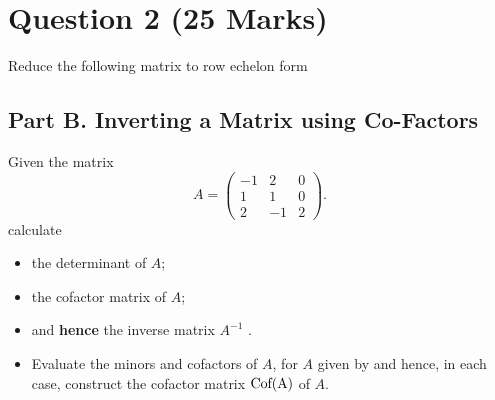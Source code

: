 \documentclass[12pt,a4paper]{article}
\begin{document}
	\section*{Question 2 (25 Marks)}
	


		
		Reduce the following matrix to row echelon form
\subsection*{Part B. Inverting a Matrix using Co-Factors}
	
	
	
	
	Given the  matrix 
	\begin{equation*}
	A=\left( \begin{array}{rrr}
	-1 & 2 & 0\\
	1 & 1 & 0\\
	2 & -1 & 2
	\end{array} \right).
	\end{equation*}
	calculate
	\begin{itemize}
		\item the determinant of $A$;
		\item the cofactor matrix of $A$;
		\item and {\bf hence} the inverse matrix $A^{-1}$ .
	\end{itemize}
	
	
	
	\begin{itemize}	
		\item Evaluate the  minors and cofactors of $A$, for $A$ given by
		and hence, in each case, construct the cofactor matrix $\textnormal{Cof(A)}$ of $A$.
	\end{itemize}
	
\end{document}
